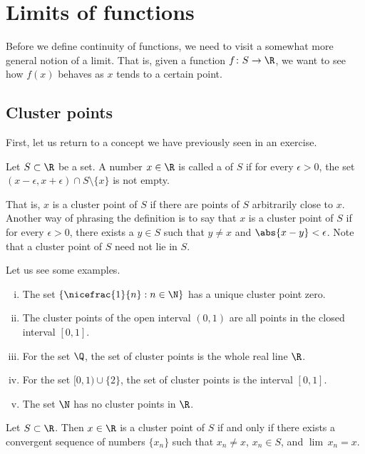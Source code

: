\documentclass[12pt]{book}
\begin{document}
\section{Limits of functions}
\label{sec:limoffunc}


Before we define continuity of functions, we need to visit a somewhat
more general notion of a limit.
That is, given a function $f \colon S \to
\R$, we want to see how $f(x)$ behaves as $x$ tends to a certain point.

\subsection*{Cluster points}

First,
let us return to a concept we have previously seen in an exercise.

\begin{defn}
Let $S \subset \R$ be a set.
A number $x \in \R$ is called
a \emph{} of $S$
if for every $\epsilon > 0$, the set $(x-\epsilon,x+\epsilon) \cap S
\setminus \{ x \}$ is not empty.
\end{defn}

That is, $x$ is a cluster point of $S$ if there are points of $S$
arbitrarily close to $x$.
Another way of phrasing the definition is to say
that $x$ is a cluster point of $S$ if for every $\epsilon > 0$, there
exists a $y \in S$ such that $y \not= x$ and $\abs{x - y} < \epsilon$.
Note that a cluster point of $S$ need not lie in $S$.

Let us see some examples.
\begin{enumerate}[(i)]
\item The set
$\{ \nicefrac{1}{n} : n \in \N \}$ has a unique cluster point zero.
\item The cluster points of the open interval $(0,1)$ are
all points in the closed interval $[0,1]$.
\item For the set $\Q$, the set of
cluster points is the whole real line $\R$.
\item For the set $[0,1) \cup \{ 2 \}$,
the set of cluster points is the interval $[0,1]$.
\item The set $\N$ has no cluster points in $\R$.
\end{enumerate}

\begin{prop}
Let $S \subset \R$.
Then $x \in \R$ is a cluster point of $S$
if and only if
there exists a convergent sequence of numbers $\{ x_n \}$ such that
$x_n \not= x$, $x_n \in S$, and $\lim\, x_n = x$.
\end{prop}
\end{document}

